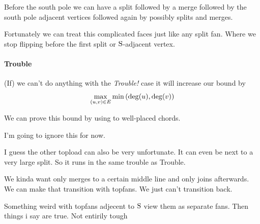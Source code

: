 Before the south pole we can have a split followed by a merge followed by the south pole adjacent vertices followed again by possibly splits and merges.

Fortunately we can treat this complicated faces just like any split fan. Where we stop flipping before the first split or $\mathrm{S}$-adjacent vertex.



\paragraph{Trouble}
(If) we can't do anything with the \emph{Trouble!} case  it will increase our bound by $$\max_{(u,v) \in E}   \min\left( { \deg(u), \deg(v) } \right)$$

We can prove this bound by using  to well-placed chords. 

I'm going to ignore this for now.

I guess the other topload can also be very unfortunate. It can even be next to a very large split. So it runs in the same trouble as Trouble.

We kinda want only merges to a certain middle line and only joins afterwards. We can make that transition with topfans. We just can't transition back.

Something weird with topfans adjecent to $\mathrm{S}$ view them as separate fans. Then things i say are true. Not entirily tough
